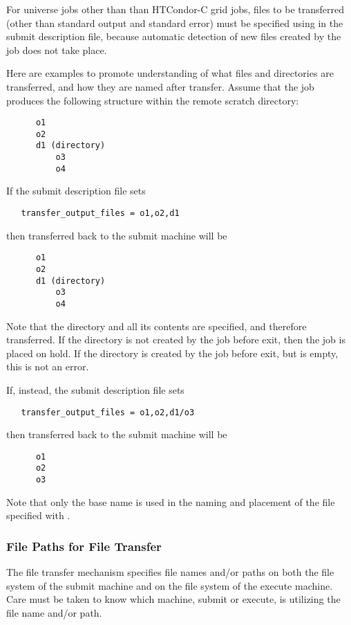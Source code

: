 For  universe jobs other than than HTCondor-C grid jobs,
files to be transferred 
(other than standard output and standard error)
must be specified using 
in the submit description file, because automatic detection of new files
created by the job does not take place.

Here are examples to promote understanding of what files and
directories are transferred, and how they are named after transfer.
Assume that the job produces the following structure within the
remote scratch directory:
\begin{verbatim}
      o1
      o2
      d1 (directory)
          o3
          o4 
\end{verbatim}

If the submit description file sets
\begin{verbatim}
   transfer_output_files = o1,o2,d1
\end{verbatim}
then transferred back to the submit machine will be
\begin{verbatim}
      o1
      o2
      d1 (directory)
          o3
          o4 
\end{verbatim}
Note that the directory  and all its contents are specified,
and therefore transferred.  
If the directory  is not created by the job before exit,
then the job is placed on hold. 
If the directory  is created by the job before exit,
but is empty, this is not an error.

If, instead, the submit description file sets
\begin{verbatim}
   transfer_output_files = o1,o2,d1/o3
\end{verbatim}
then transferred back to the submit machine will be
\begin{verbatim}
      o1
      o2
      o3
\end{verbatim}
Note that only the base name is used in the naming and placement
of the file specified with .


\subsubsection{File Paths for File Transfer}



The file transfer mechanism specifies file names and/or paths on
both the file system of the submit machine and on the
file system of the execute machine.
Care must be taken to know which machine, submit or execute,
is utilizing the file name and/or path. 

